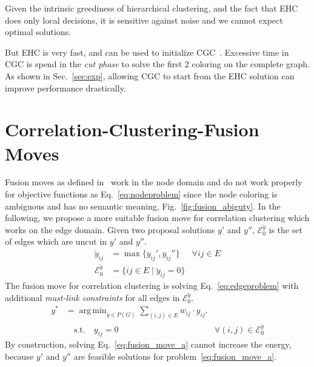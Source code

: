 \documentclass[10pt,twocolumn,letterpaper]{article}
\DeclareMathOperator*{\argmin}{arg\,min}
\theoremstyle{definition}
\begin{document}
Given the intrinsic greediness of hierarchical clustering, 
and the fact that EHC does only local decisions, it is 
sensitive against noise and we cannot expect optimal solutions.

But EHC is very fast, and can be used to initialize
CGC~\cite{beier_2014_cvpr}. Excessive time in CGC
is spend in the \emph{cut phase} to solve the 
first 2 coloring on the complete graph.
As shown in Sec.~\ref{sec:exp},
allowing CGC to start from the EHC solution
can improve performance drastically.






\section{Correlation-Clustering-Fusion Moves}\label{sec:cc_fm}

Fusion moves as defined in~\cite{Lempitsky-2010} work
in the node domain and do not work properly for 
objective functions as Eq.~\ref{eq:nodeproblem} since
the node coloring is ambiguous and has no semantic meaning, \cf Fig.~\ref{fig:fusion_abiguty}.
In the following, we propose a more suitable fusion move for correlation
clustering which works on the edge domain.
%
Given two proposal solutions $y'$ and $y''$,
$\mathcal{E}_0^{\breve{y}}$ is the set of edges
which are uncut in $y'$ and $y''$.
%
\begin{align}
\breve{y}_{ij}    & = \max\{ y_{ij}', y_{ij}''\}  & \forall {ij}\in E\\  %
\mathcal{E}_0^{\breve{y}}  & =  \{ ij \in E \; | \; \breve{y}_{ij} = 0 \}
\end{align}
%
The fusion move for correlation clustering is solving Eq.~\ref{eq:edgeproblem}
with additional \emph{must-link constraints} for all edges in $\mathcal{E}_0^{\breve{y}}$.
%
\begin{align}
  y^* &= \argmin_{y \in P(G)} \sum_{ (i,j) \in E } w_{ij} \cdot y_{ij} \label{eq:fusion_move_a}.\\ 
      &\quad \textrm{s.t.} \quad y_{ij} = 0 & \forall (i, j) \in \mathcal{E}_0^{\breve{y}} \nonumber
\end{align}
%
By construction, solving Eq.~\ref{eq:fusion_move_a} cannot increase the energy,
because $y'$ and $y''$ are feasible solutions for problem~\ref{eq:fusion_move_a}.
%
\end{document}
